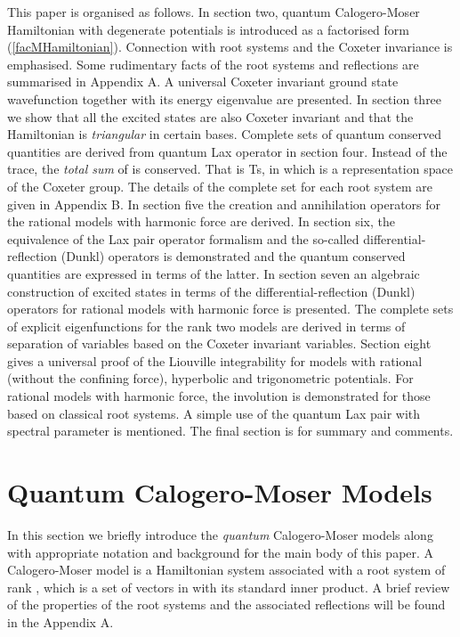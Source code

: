 \documentclass[a4paper,12pt]{article}
\begin{document}
This paper is organised as follows. In section two, quantum Calogero-Moser
Hamiltonian with degenerate potentials is introduced as a
factorised form (\ref{facMHamiltonian}). Connection with root systems and
the Coxeter invariance is emphasised.
Some rudimentary facts of the root systems and reflections are summarised
in Appendix A. A universal Coxeter invariant ground state wavefunction
together with its energy eigenvalue are presented.
In section three we show that all the excited states are also Coxeter
invariant and that the Hamiltonian is {\em triangular} in certain bases.
Complete sets of quantum conserved quantities are
derived from quantum Lax operator \coordHE{} in section four.
Instead of the trace, the {\em total sum\/} of \coordHE{} is conserved.
That is Ts\coordHE{}, in which
\coordHE{} is a representation space of the Coxeter group.
The details of the
complete set for each root system are given in Appendix B.
In section five the creation and annihilation operators for the rational
models with harmonic force are derived.
In section six, the equivalence of the Lax pair operator formalism and
the so-called differential-reflection (Dunkl) operators is demonstrated
and the quantum conserved quantities are expressed in terms of the latter.
In section seven an algebraic construction of excited states
in terms of the differential-reflection (Dunkl) operators for rational
models with harmonic force is presented.
The complete sets of explicit eigenfunctions for the rank two models
are derived in terms of separation of variables based on the Coxeter
invariant variables.
Section eight gives a universal proof of the Liouville integrability for
models with rational (without the confining force), hyperbolic and
trigonometric potentials.
For rational models with harmonic force, the involution is demonstrated
for those based on classical root systems.
A simple use of the quantum Lax pair with spectral parameter is mentioned.
The final section is for summary and comments.



\section{Quantum Calogero-Moser Models}
\label{cal-mo}
\setcounter{equation}{0}
In this section we briefly introduce the {\em quantum\/} Calogero-Moser
models along with
appropriate notation and background for the main body of this paper.
A   Calogero-Moser model is a
Hamiltonian system associated with a root system \myHighlight{\(\Delta\)}\coordHE{}
of rank \coordHE{},
which is a set of
vectors in \coordHE{} with its standard inner product.
A brief review of the properties of the root
systems and the associated reflections
will be found in the Appendix A.
\end{document}
